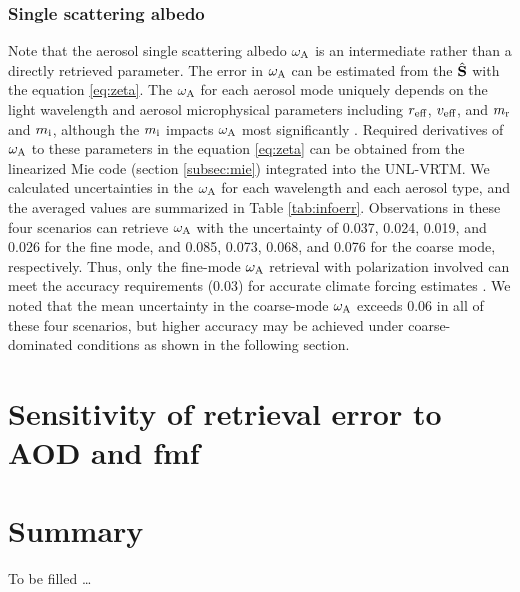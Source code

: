\subsubsection{Single scattering albedo}

Note that the aerosol single scattering albedo $\omega_\text{A}$ is an intermediate rather
than a directly retrieved parameter. The error in $\omega_\text{A}$ can be estimated
from the $\hat{\mathbf{S}}$ with the equation \eqref{eq:zeta}. The $\omega_\text{A}$ for each
aerosol mode uniquely depends on the light wavelength and aerosol 
microphysical parameters including $r_\text{eff}$, $v_\text{eff}$, and $m_\text{r}$ and $m_\text{i}$,
although the $m_\text{i}$ impacts $\omega_\text{A}$ most significantly \citep{Hansen74}.
Required derivatives of $\omega_\text{A}$ to these parameters in the equation
\eqref{eq:zeta} can be obtained from the linearized Mie code (section
\ref{subsec:mie}) integrated into the UNL-VRTM. We calculated uncertainties 
in the $\omega_\text{A}$ for each wavelength and each aerosol type, and the averaged 
values are summarized in Table \ref{tab:infoerr}. Observations in these four 
scenarios can  retrieve $\omega_\text{A}$ with the uncertainty of 0.037, 0.024, 0.019, 
and 0.026 for  the fine mode, and 0.085, 0.073, 0.068, and 0.076 for the coarse
mode, respectively. Thus, only the fine-mode $\omega_\text{A}$ retrieval with polarization
involved can meet the accuracy requirements (0.03) for accurate climate forcing
estimates \citep{Mishchenko04}. We noted that the mean uncertainty in the
coarse-mode $\omega_\text{A}$ exceeds 0.06 in all of these four scenarios, but higher
accuracy may be achieved under coarse-dominated conditions as shown in the
following section.  

\section{Sensitivity of retrieval error to AOD and fmf} \label{sec:infosensi}



\section{Summary} \label{sec:infosummary}

 To be filled \ldots
